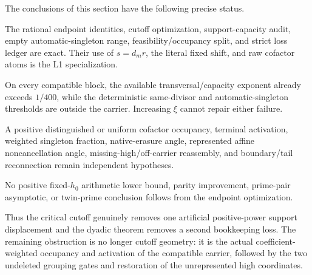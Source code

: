 The conclusions of this section have the following precise status.
\begin{description}[leftmargin=3.3em,style=nextline]
 \item[Exact L0/L1 progress.]
 The rational endpoint identities, cutoff optimization, support-capacity
 audit, empty automatic-singleton range, feasibility/occupancy split, and
 strict loss ledger are exact.  Their use of \(s=d_mr\), the literal fixed
 shift, and raw cofactor atoms is the L1 specialization.

 \item[Closed support-only doors.]
 On every compatible block, the available transversal/capacity exponent
 already exceeds \(1/400\), while the deterministic same-divisor and
 automatic-singleton thresholds are outside the carrier.  Increasing
 \(\xi\) cannot repair either failure.

 \item[Open arithmetic doors.]
 A positive distinguished or uniform cofactor occupancy, terminal
 activation, weighted singleton fraction, native-erasure angle,
 represented affine noncancellation angle, missing-high/off-carrier
 reassembly, and boundary/tail reconnection remain independent hypotheses.

 \item[Not proved (L2).]
 No positive fixed-\(h_0\) arithmetic lower bound, parity improvement,
 prime-pair asymptotic, or twin-prime conclusion follows from the endpoint
 optimization.
\end{description}

Thus the critical cutoff genuinely removes one artificial positive-power
support displacement and the dyadic theorem removes a second bookkeeping
loss.  The remaining obstruction is no longer cutoff geometry: it is the
 actual coefficient-weighted occupancy and activation of the compatible
 carrier, followed by the two undeleted grouping gates and restoration of
 the unrepresented high coordinates.
